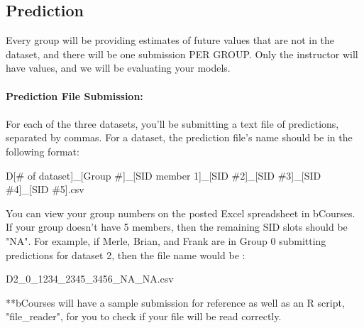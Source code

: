 \documentclass[a4paper]{article}
\begin{document}
\subsection{Prediction}
Every group will be providing estimates of future values that are not in the dataset, and there will be one submission PER GROUP.
Only the instructor will have values, and we will be evaluating your models.\\
\\
\textbf{Prediction File Submission:}\\
\\
For each of the three datasets, you'll be submitting a text file of predictions, separated by commas. For a dataset, the prediction file's name should be in the following format:
\begin{center}
    D[\# of dataset]\_[Group \#]\_[SID member 1]\_[SID \#2]\_[SID \#3]\_[SID \#4]\_[SID \#5].csv
\end{center}
You can view your group numbers on the posted Excel spreadsheet in bCourses. If your group doesn't have 5 members, then the remaining SID slots should be "NA". For example, if Merle, Brian, and Frank are in Group 0 submitting predictions for dataset 2, then the file name would be :
\begin{center}
    D2\_0\_1234\_2345\_3456\_NA\_NA.csv
\end{center}
**bCourses will have a sample submission for reference as well as an R script, "file\_reader", for you to check if your file will be read correctly.
\end{document}
